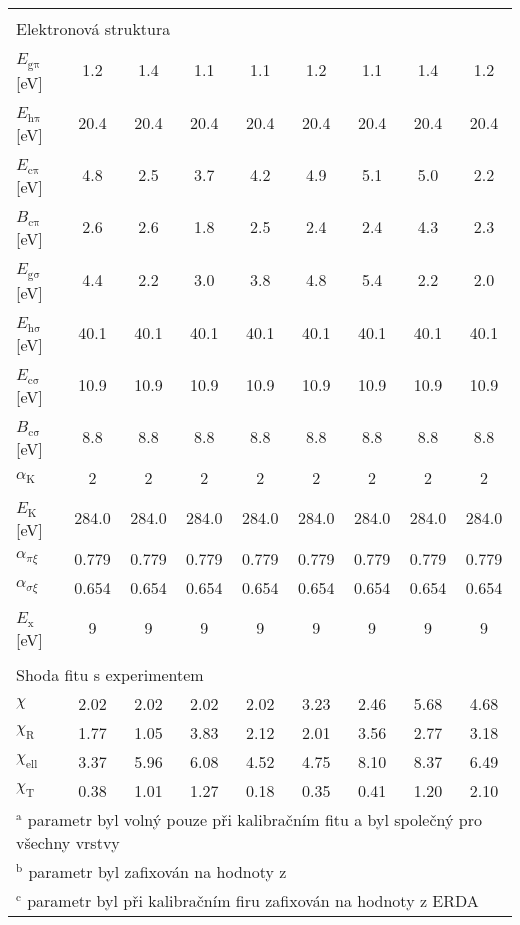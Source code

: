 \begin{tabular}{lcccccccc}
\multicolumn{9}{l}{}\\
\multicolumn{9}{l}{Elektronová struktura}\\
\hline
$E_\mathrm{g\pi}$\,[eV] & 1.2 & 1.4 & 1.1 & 1.1 & 1.2 & 1.1 & 1.4 & 1.2\\
$E_\mathrm{h\pi}$\,[eV] & 20.4 & 20.4 & 20.4 & 20.4 & 20.4 & 20.4 & 20.4 & 20.4\\
$E_\mathrm{c\pi}$\,[eV] & 4.8 & 2.5 & 3.7 & 4.2 & 4.9 & 5.1 & 5.0 & 2.2\\
$B_\mathrm{c\pi}$\,[eV] & 2.6 & 2.6 & 1.8 & 2.5 & 2.4 & 2.4 & 4.3 & 2.3\\
$E_\mathrm{g\sigma}$\,[eV] & 4.4 & 2.2 & 3.0 & 3.8 & 4.8 & 5.4 & 2.2 & 2.0\\
$E_\mathrm{h\sigma}$\,[eV] & 40.1 & 40.1 & 40.1 & 40.1 & 40.1 & 40.1 & 40.1 & 40.1\\
$E_\mathrm{c\sigma}$\,[eV] & 10.9 & 10.9 & 10.9 & 10.9 & 10.9 & 10.9 & 10.9 & 10.9\\
$B_\mathrm{c\sigma}$\,[eV] & 8.8 & 8.8 & 8.8 & 8.8 & 8.8 & 8.8 & 8.8 & 8.8\\
$\alpha_\mathrm{K}$ & 2 & 2 & 2 & 2 & 2 & 2 & 2 & 2\\
$E_\mathrm{K}$\,[eV] & 284.0 & 284.0 & 284.0 & 284.0 & 284.0 & 284.0 & 284.0 & 284.0\\
$\alpha_{\pi\xi}$ & 0.779 & 0.779 & 0.779 & 0.779 & 0.779 & 0.779 & 0.779 & 0.779\\
$\alpha_{\sigma\xi}$ & 0.654 & 0.654 & 0.654 & 0.654 & 0.654 & 0.654 & 0.654 & 0.654\\
$E_\mathrm{x}$\,[eV] & 9 & 9 & 9 & 9 & 9 & 9 & 9 & 9\\

\multicolumn{9}{l}{}\\
\multicolumn{9}{l}{Shoda fitu s experimentem}\\
\hline
$\chi$ & 2.02 & 2.02 & 2.02 & 2.02 & 3.23 & 2.46 & 5.68 & 4.68\\
$\chi_\mathrm{R}$ & 1.77 & 1.05 & 3.83 & 2.12 & 2.01 & 3.56 & 2.77 & 3.18\\
$\chi_\mathrm{ell}$ & 3.37 & 5.96 & 6.08 & 4.52 & 4.75 & 8.10 & 8.37 & 6.49\\
$\chi_\mathrm{T}$ & 0.38 & 1.01 & 1.27 & 0.18 & 0.35 & 0.41 & 1.20 & 2.10\\


\hline
\multicolumn{9}{l}{$^\mathrm{a}$ parametr byl volný pouze při kalibračním fitu a byl společný pro všechny vrstvy}\\
\multicolumn{9}{l}{$^\mathrm{b}$ parametr byl zafixován na hodnoty z \cite{Franta2011}}\\
\multicolumn{9}{l}{$^\mathrm{c}$ parametr byl při kalibračním firu zafixován na hodnoty z ERDA}\\
\end{tabular}
